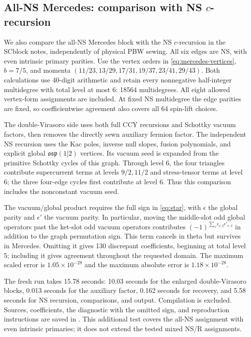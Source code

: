 \documentclass[11pt]{article}
\numberwithin{equation}{section}
\begin{document}
\subsection{All-NS Mercedes: comparison with NS \texorpdfstring{$c$}{c}-recursion}

We also compare the all-NS Mercedes block with the NS $c$-recursion in
the SCblock notes, independently of physical PBW sewing. All six edges
are NS, with even intrinsic primary parities. Use the vertex orders in
\eqref{eq:mercedes-vertices}, $b=7/5$, and momenta
$(11/23,13/29,17/31,19/37,23/41,29/43)$. Both calculations use 40-digit
arithmetic and retain every nonnegative half-integer multidegree with
total level at most 6: 18564 multidegrees. All eight allowed vertex-form
assignments are included. At fixed NS multidegree the edge parities are
fixed, so coefficientwise agreement also covers all 64 spin-lift choices.

The double-Virasoro side uses both full CCY recursions and Schottky vacuum
factors, then removes the directly sewn auxiliary fermion factor. The
independent NS recursion uses the Kac poles, inverse null slopes, fusion
polynomials, and explicit global $\mathfrak{osp}(1|2)$ vertices. Its vacuum
seed is expanded from the primitive Schottky cycles of this graph. Through
level 6, the four triangles contribute supercurrent terms at levels
$9/2,11/2$ and stress-tensor terms at level 6; the three four-edge cycles
first contribute at level 6. Thus this comparison includes the nonconstant
vacuum seed.

The vacuum/global product requires the full sign in \eqref{eq:star}, with
$\epsilon$ the global parity and $\epsilon'$ the vacuum parity. In
particular, moving the middle-slot odd global operators past the ket-slot
odd vacuum operators contributes
$(-1)^{\sum_v\epsilon_{v,2}\epsilon'_{v,3}}$ in addition to the graph
permutation sign. This term cancels in theta but survives in Mercedes.
Omitting it gives 130 discrepant coefficients, beginning at total level 5;
including it gives agreement throughout the requested domain. The maximum
scaled error is $1.05\times10^{-28}$ and the maximum absolute error is
$1.18\times10^{-28}$.

The fresh run takes 15.78 seconds: 10.03 seconds for the enlarged
double-Virasoro blocks, 0.013 seconds for the auxiliary factor, 0.162 seconds
for recovery, and 5.58 seconds for NS recursion, comparisons, and output.
Compilation is excluded. Sources, coefficients, the diagnostic with the
omitted sign, and reproduction instructions are saved in
.
This additional test covers the all-NS assignment with even intrinsic
primaries; it does not extend the tested mixed NS/R assignments.
\end{document}
